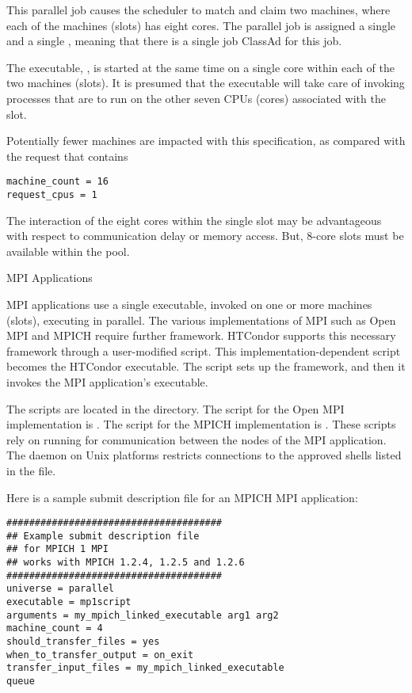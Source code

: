 This parallel job causes the scheduler to match and claim two
machines, where each of the machines (slots) has eight cores.
The parallel job is assigned a single 
and a single , meaning that there is a single job
ClassAd for this job.

The executable, , is started at the same time
on a single core within each of the two machines (slots).
It is presumed that the executable will take care of invoking
processes that are to run on the other seven CPUs (cores)
associated with the slot. 

Potentially fewer machines are impacted with this specification,
as compared with the request that contains
\footnotesize
\begin{verbatim}
machine_count = 16
request_cpus = 1
\end{verbatim}
\normalsize
The interaction of the eight cores within the single slot may 
be advantageous with respect to communication delay or memory access.
But, 8-core slots must be available within the pool.

\label{sec:parallel-mpi-submit}
\begin{description}
\item[MPI Applications]
\end{description}


MPI applications use a single executable, 
invoked on one or more machines (slots), executing in parallel. 
The various implementations of MPI
such as Open MPI and MPICH require further framework.
HTCondor supports this necessary framework through 
a user-modified script.
This implementation-dependent script becomes the HTCondor executable.
The script sets up the framework,
and then it invokes the MPI application's executable.

The scripts are located in the
 directory.
The script for the Open MPI implementation is .
The script for the MPICH implementation is .
These scripts rely on running  
for communication between the nodes of the MPI application.
The  daemon on Unix platforms restricts
connections to the approved shells listed in the  file.

Here is a sample submit description file for an MPICH MPI application:

\footnotesize
\begin{verbatim}
######################################
## Example submit description file
## for MPICH 1 MPI
## works with MPICH 1.2.4, 1.2.5 and 1.2.6
######################################
universe = parallel
executable = mp1script
arguments = my_mpich_linked_executable arg1 arg2
machine_count = 4
should_transfer_files = yes
when_to_transfer_output = on_exit
transfer_input_files = my_mpich_linked_executable
queue
\end{verbatim}
\normalsize

